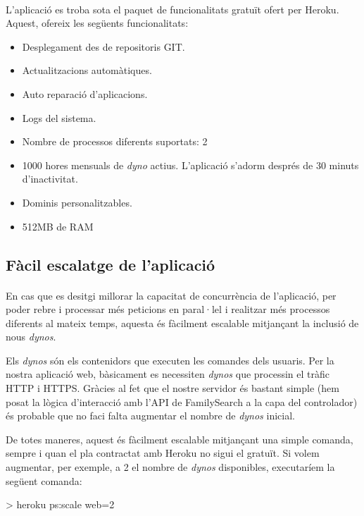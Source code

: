     \paragraph{}
    L'aplicació es troba sota el paquet de funcionalitats gratuït ofert per Heroku. Aquest, ofereix les següents funcionalitats:

    \begin{itemize}
        \item Desplegament des de repositoris GIT.
        \item Actualitzacions automàtiques.
        \item Auto reparació d'aplicacions.
        \item Logs del sistema.
        \item Nombre de processos diferents suportats: 2
        \item 1000 hores mensuals de \emph{dyno} actius. L'aplicació s'adorm després de 30 minuts d'inactivitat.
        \item Dominis personalitzables.
        \item 512MB de RAM
    \end{itemize}


    \subsection{Fàcil escalatge de l'aplicació}

    \paragraph{}
    En cas que es desitgi millorar la capacitat de concurrència de l'aplicació, per poder rebre i processar més peticions en paral·lel i realitzar més processos diferents al mateix temps, aquesta és fàcilment escalable mitjançant la inclusió de nous \emph{dynos}.

    Els \emph{dynos} són els contenidors que executen les comandes dels usuaris. Per la nostra aplicació web, bàsicament es necessiten \emph{dynos} que processin el tràfic HTTP i HTTPS. Gràcies al fet que el nostre servidor és bastant simple (hem posat la lògica d'interacció amb l'API de FamilySearch a la capa del controlador) és probable que no faci falta augmentar el nombre de \emph{dynos} inicial.

    De totes maneres, aquest és fàcilment escalable mitjançant una simple comanda, sempre i quan el pla contractat amb Heroku no sigui el gratuït. Si volem augmentar, per exemple, a 2 el nombre de \emph{dynos} disponibles, executaríem la següent comanda:

    \begin{displayquote}
        > heroku ps:scale web=2
    \end{displayquote}
